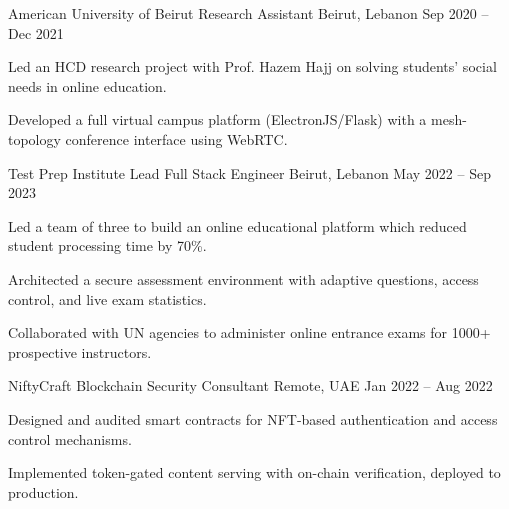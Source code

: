\begin{cventries}

  \cventry
    {American University of Beirut} %
    {Research Assistant} %
    {Beirut, Lebanon} %
    {Sep 2020 -- Dec 2021} %
    {
      \begin{cvitems} %
        \item {Led an HCD research project with Prof. Hazem Hajj on solving students' social needs in online education.}
        \item {Developed a full virtual campus platform (ElectronJS/Flask) with a mesh-topology conference interface using WebRTC.}
      \end{cvitems}
    }


\end{cventries}


\begin{cventries}

\cventry
    {Test Prep Institute} %
    {Lead Full Stack Engineer} %
    {Beirut, Lebanon} %
    {May 2022 -- Sep 2023} %
    {
      \begin{cvitems} %
        \item {Led a team of three to build an online educational platform which reduced student processing time by 70\%.}
        \item {Architected a secure assessment environment with adaptive questions, access control, and live exam statistics.}
        \item {Collaborated with UN agencies to administer online entrance exams for 1000+ prospective instructors.}
      \end{cvitems}
    }

\cventry
    {NiftyCraft} %
    {Blockchain Security Consultant} %
    {Remote, UAE} %
    {Jan 2022 -- Aug 2022} %
    {
      \begin{cvitems} %
        \item {Designed and audited smart contracts for NFT-based authentication and access control mechanisms.}
        \item {Implemented token-gated content serving with on-chain verification, deployed to production.}
      \end{cvitems}
    }

\end{cventries}
